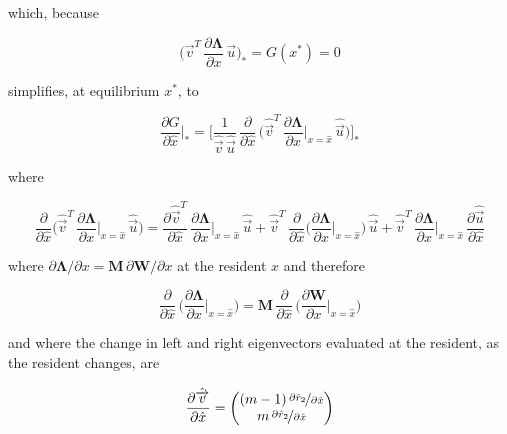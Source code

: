 which, because

\begin{equation}
    \bigg( \overrightarrow{v}^T\,\frac{\partial \pmb \Lambda}{\partial x}\,\overrightarrow{u} \bigg)_* = G(x^*) = 0
    \label{eq:gradient_is_zero_at_equilibrium}
\end{equation}

simplifies, at equilibrium $x^*$, to

\begin{equation}
    \frac{\partial G}{\partial \hat x}\bigg|_* = \Bigg[ \frac{1}{\hat{\overrightarrow{v}}\,\hat{\overrightarrow{u}}} \, \frac{\partial}{\partial \hat x}\,\bigg(\hat{\overrightarrow{v}}^T\,\frac{\partial \pmb \Lambda}{\partial x}\bigg|_{x=\hat x}\,\hat{\overrightarrow{u}}\bigg)\Bigg]_*
    \label{eq:deriv_gradient_equilibrium}
\end{equation}

where

\begin{equation}
    \frac{\partial}{\partial \hat{x}} \bigg( \hat{\overrightarrow{v}}^T\,\frac{\partial \pmb{\Lambda}}{\partial x}\bigg|_{x=\hat{x}}\,\hat{\overrightarrow{u}} \bigg) = \frac{\partial \hat{\overrightarrow{v}}^T}{\partial \hat{x}}\,\frac{\partial \pmb{\Lambda}}{\partial x}\bigg|_{x=\hat{x}}\,\hat{\overrightarrow{u}} + \hat{\overrightarrow{v}}^T\,\frac{\partial}{\partial \hat{x}} \bigg(\frac{\partial \pmb{\Lambda}}{\partial x}\bigg|_{x=\hat{x}}\bigg)\,\hat{\overrightarrow{u}} + \hat{\overrightarrow{v}}^T\,\frac{\partial \pmb{\Lambda}}{\partial x}\bigg|_{x=\hat{x}}\,\frac{\partial \hat{\overrightarrow{u}}}{\partial \hat{x}}
\end{equation}

where $\partial \pmb \Lambda / \partial x = \pmb M \, \partial \pmb W / \partial x$ at the resident $\hat x$ and therefore

\begin{equation}
    \frac{\partial}{\partial \hat x}\,\bigg(\frac{\partial \pmb \Lambda}{\partial x}\bigg|_{x=\hat x}\bigg) = \pmb M \, \frac{\partial}{\partial \hat x}\,\bigg(\frac{\partial \pmb W}{\partial x}\bigg|_{x=\hat x}\bigg)
\end{equation}

and where the change in left and right eigenvectors evaluated at the resident, as the resident changes, are

\begin{equation}
    \frac{\partial \hat{\overrightarrow{v}} }{\partial \hat x} = 
    \begin{pmatrix}
        (m-1)\,\nicefrac{\partial \hat r_2}{\partial \hat x}\\
        m\,\nicefrac{\partial \hat r_2}{\partial \hat x}
    \end{pmatrix}
    \label{eq:deriv_left_eigenvector_resident}
\end{equation}

